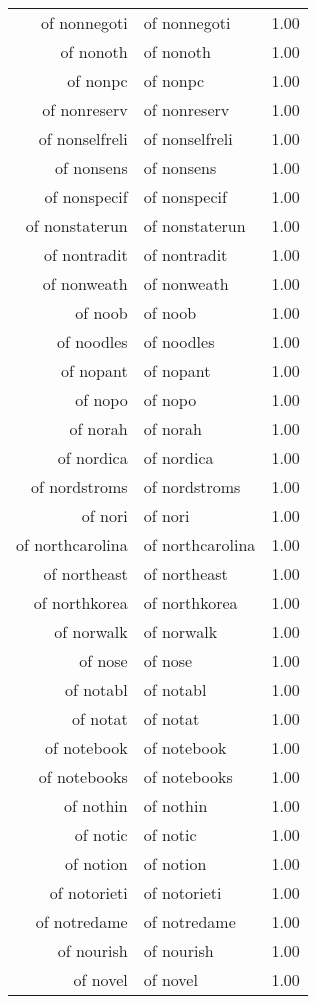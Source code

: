 \begin{table}[ht]
\begin{tabular}{rlr}
  of nonnegoti & of nonnegoti & 1.00 \\ 
  of nonoth & of nonoth & 1.00 \\ 
  of nonpc & of nonpc & 1.00 \\ 
  of nonreserv & of nonreserv & 1.00 \\ 
  of nonselfreli & of nonselfreli & 1.00 \\ 
  of nonsens & of nonsens & 1.00 \\ 
  of nonspecif & of nonspecif & 1.00 \\ 
  of nonstaterun & of nonstaterun & 1.00 \\ 
  of nontradit & of nontradit & 1.00 \\ 
  of nonweath & of nonweath & 1.00 \\ 
  of noob & of noob & 1.00 \\ 
  of noodles & of noodles & 1.00 \\ 
  of nopant & of nopant & 1.00 \\ 
  of nopo & of nopo & 1.00 \\ 
  of norah & of norah & 1.00 \\ 
  of nordica & of nordica & 1.00 \\ 
  of nordstroms & of nordstroms & 1.00 \\ 
  of nori & of nori & 1.00 \\ 
  of northcarolina & of northcarolina & 1.00 \\ 
  of northeast & of northeast & 1.00 \\ 
  of northkorea & of northkorea & 1.00 \\ 
  of norwalk & of norwalk & 1.00 \\ 
  of nose & of nose & 1.00 \\ 
  of notabl & of notabl & 1.00 \\ 
  of notat & of notat & 1.00 \\ 
  of notebook & of notebook & 1.00 \\ 
  of notebooks & of notebooks & 1.00 \\ 
  of nothin & of nothin & 1.00 \\ 
  of notic & of notic & 1.00 \\ 
  of notion & of notion & 1.00 \\ 
  of notorieti & of notorieti & 1.00 \\ 
  of notredame & of notredame & 1.00 \\ 
  of nourish & of nourish & 1.00 \\ 
  of novel & of novel & 1.00 \\ 

\end{tabular}
\end{table}
